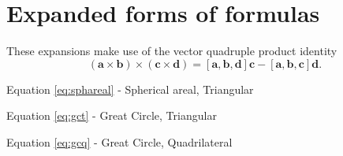\documentclass{amsart}[12pt]
\begin{document}
\section{Expanded forms of formulas}

These expansions make use of the vector quadruple product identity
\begin{equation}
(\mathbf a \times \mathbf b) \times (\mathbf c \times \mathbf d)
= [\mathbf a, \mathbf b, \mathbf d] \mathbf c
- [\mathbf a, \mathbf b, \mathbf c] \mathbf d.
\end{equation}

Equation \ref{eq:sphareal} - Spherical areal, Triangular

Equation \ref{eq:gct} - Great Circle, Triangular

Equation \ref{eq:gcq} - Great Circle, Quadrilateral

\end{document}
